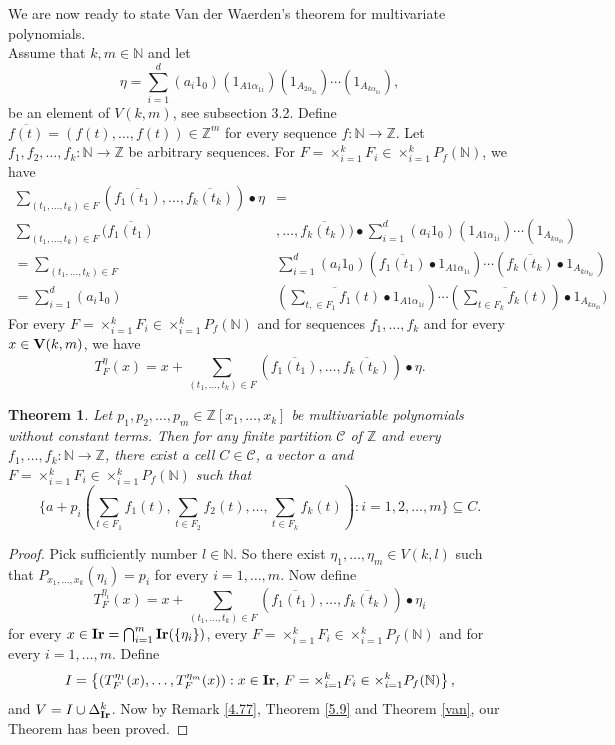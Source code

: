 \documentclass{amsart}
\newtheorem{theorem}{Theorem}[section]
\theoremstyle{definition}
\theoremstyle{remark}
\numberwithin{equation}{section}
\newcommand{\Ir}{{\bf{Ir}}}
\newcommand{\V}{{\bf{V}}}
\begin{document}
We are now ready to state Van der Waerden's theorem for multivariate polynomials.\\
Assume that $k,m\in\mathbb{N}$ and let 
\[
\eta=\sum_{i=1}^d(a_i1_0)(1_{A1\alpha_{1i}})(1_{A_{2\alpha_{2i}}})\cdots(1_{A_{k\alpha_{ki}}}), 
\]
be an element of $V(k,m)$, see subsection 3.2. Define $\overline{f(t)}=(f(t),\ldots,f(t))\in\mathbb{Z}^m$ for every sequence $f:\mathbb{N}\to\mathbb{Z}$. Let $f_1,f_2,\ldots,f_k:\mathbb{N}\to \mathbb{Z}$ be arbitrary sequences.  For $F=\times _{i=1}^kF_i\in \times_{i=1}^kP_f(\mathbb{N})$, we have 
	\begin{align*}
	\sum_{(t_1,\ldots,t_k)\in F}	(\overline{f_1(t_1)},\ldots,\overline{f_k(t_k)})\bullet \eta&=\\
	\sum_{(t_1,\ldots,t_k)\in F}(\overline{f_1(t_1)}&,\ldots,\overline{f_k(t_k)})\bullet \sum_{i=1}^d(a_i1_0)(1_{A1\alpha_{1i}})\cdots(1_{A_{k\alpha_{ki}}})\\
		=\sum_{(t_1,\ldots,t_k)\in F}&\sum_{i=1}^d(a_i1_0)(\overline{f_1(t_1)}\bullet 1_{A1\alpha_{1i}})\cdots(\overline{f_k(t_k)}\bullet 1_{A_{k\alpha_{ki}}})\\
		=\sum_{i=1}^d(a_i1_0)&(\overline{\sum_{t,\in F_1}f_1(t)}\bullet 1_{A1\alpha_{1i}})\cdots(\overline{\sum_{t\in F_k}f_k(t)})\bullet 1_{A_{k\alpha_{ki}}})
	\end{align*}
For every $F=\times_{i=1}^kF_i\in\times_{i=1}^k P_f(\mathbb{N})$ and for sequences $f_1,\ldots,f_k$ and for every $x\in\V(k,m)$, we have 
\[
T_F^\eta(x)=x+	\sum_{(t_1,\ldots,t_k)\in F}	(\overline{f_1(t_1)},\ldots,\overline{f_k(t_k)})\bullet \eta.
\]

 	  
	\begin{theorem} 
 Let  \( p_1, p_2,\ldots, p_m\in \mathbb{Z}[x_1, \ldots, x_k] \) be multivariable polynomials without constant terms. Then for any finite partition $\mathcal{C}$ of \( \mathbb{Z} \) and every $f_1,\ldots,f_k:\mathbb{N}\to \mathbb{Z}$, there exist a cell $C\in\mathcal{C}$, a vector  \(a \) and $F=\times_{i=1}^kF_i\in\times_{i=1}^k P_f(\mathbb{N})$ such that \[
\{a+p_i(\sum_{t\in F_1}f_1(t),\sum_{t\in F_2}f_2(t),\ldots,\sum_{t\in F_k}f_k(t)):i=1,2,\ldots,m\}\subseteq C.
\] 
\end{theorem}
\begin{proof}
	Pick sufficiently number $l\in\mathbb{N}$. So there exist $\eta_1,\ldots,\eta_m\in V(k,l)$ such that $P_{x_1,\ldots,x_k}(\eta_i)=p_i$ for every $i=1,\ldots,m$. Now define 
	\[
	T_F^{\eta_i}(x)=x+	\sum_{(t_1,\ldots,t_k)\in F}	(\overline{f_1(t_1)},\ldots,\overline{f_k(t_k)})\bullet \eta_i
	\] for every $x\in\Ir=\bigcap_{i=1}^m\Ir(\{\eta_i\})$, every $F=\times_{i=1}^kF_i\in\times_{i=1}^k P_f(\mathbb{N})$ and for every $i=1,\ldots,m$. Define 
	\[
	I=\left\{ \left(T_F^{\eta_1}(x), \ldots, T_F^{\eta_m}(x)\right) : x \in \Ir,\,F=\times_{i=1}^kF_i\in\times_{i=1}^k P_f(\mathbb{N}) \right\},
	\]
	and $V=I\cup \Delta_\Ir^k$. Now by Remark \ref{4.77}, Theorem \ref{5.9} and Theorem \ref{van}, our Theorem has been proved.
	\end{proof}
\end{document}
